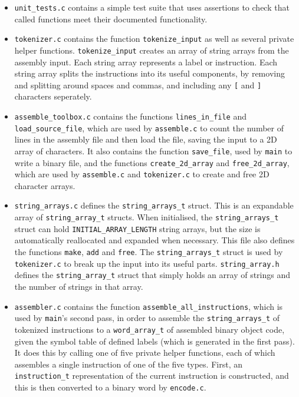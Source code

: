 \documentclass[10pt]{article}
\begin{document}
\begin{itemize}
\item \texttt{unit\_tests.c} contains a simple test suite that uses assertions to check that called functions meet their documented functionality.
\item \begin{sloppypar}\texttt{tokenizer.c} contains the function \texttt{tokenize\_input} as well as several private helper functions. \texttt{tokenize\_input} creates an array of string arrays from the assembly input. Each string array represents a label or instruction. Each string array splits the instructions into its useful components, by removing and splitting around spaces and commas, and including any \texttt{[} and \texttt{]} characters seperately.\end{sloppypar}
\item \texttt{assemble\_toolbox.c} contains the functions \texttt{lines\_in\_file} and \texttt{load\_source\_file}, which are used by \texttt{assemble.c} to count the number of lines in the assembly file and then load the file, saving the input to a 2D array of characters. It also contains the function \texttt{save\_file}, used by \texttt{main} to write a binary file, and the functions \texttt{create\_2d\_array} and \texttt{free\_2d\_array}, which are used by \texttt{assemble.c} and \texttt{tokenizer.c} to create and free 2D character arrays.
\item \texttt{string\_arrays.c} defines the \texttt{string\_arrays\_t} struct. This is an expandable array of \texttt{string\_array\_t} structs. When initialised, the \texttt{string\_arrays\_t} struct can hold \texttt{INITIAL\_ARRAY\_LENGTH} string arrays, but the size is automatically reallocated and expanded when necessary. This file also defines the functions \texttt{make}, \texttt{add} and \texttt{free}. The \texttt{string\_arrays\_t} struct is used by \texttt{tokenizer.c} to break up the input into its useful parts. \texttt{string\_array.h} defines the \texttt{string\_array\_t} struct that simply holds an array of strings and the number of strings in that array.
\item \texttt{assembler.c} contains the function \texttt{assemble\_all\_instructions}, which is used by \texttt{main}'s second pass, in order to assemble the \texttt{string\_arrays\_t} of tokenized instructions to a \texttt{word\_array\_t} of assembled binary object code, given the symbol table of defined labels (which is generated in the first pass). It does this by calling one of five private helper functions, each of which assembles a single instruction of one of the five types. First, an \texttt{instruction\_t} representation of the current instruction is constructed, and this is then converted to a binary word by \texttt{encode.c}.

\end{itemize}
\end{document}
